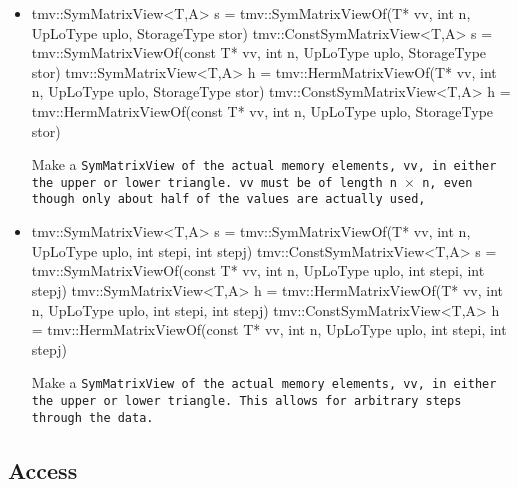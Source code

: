 \begin{itemize}
\item
\begin{tmvcode}
tmv::SymMatrixView<T,A> s = 
      tmv::SymMatrixViewOf(T* vv, int n, UpLoType uplo, 
      StorageType stor)
tmv::ConstSymMatrixView<T,A> s =
      tmv::SymMatrixViewOf(const T* vv, int n, UpLoType uplo, 
      StorageType stor)
tmv::SymMatrixView<T,A> h =
      tmv::HermMatrixViewOf(T* vv, int n, UpLoType uplo, 
      StorageType stor)
tmv::ConstSymMatrixView<T,A> h =
      tmv::HermMatrixViewOf(const T* vv, int n, UpLoType uplo, 
      StorageType stor)
\end{tmvcode}
Make a \tt{SymMatrixView} of the actual memory elements, \tt{vv}, in either the 
upper or lower triangle.
\tt{vv} must be of length \tt{n} $\times$ \tt{n}, even though only about half 
of the values are actually used,

\item
\begin{tmvcode}
tmv::SymMatrixView<T,A> s = 
      tmv::SymMatrixViewOf(T* vv, int n, UpLoType uplo, 
      int stepi, int stepj)
tmv::ConstSymMatrixView<T,A> s =
      tmv::SymMatrixViewOf(const T* vv, int n, UpLoType uplo, 
      int stepi, int stepj)
tmv::SymMatrixView<T,A> h =
      tmv::HermMatrixViewOf(T* vv, int n, UpLoType uplo, 
      int stepi, int stepj)
tmv::ConstSymMatrixView<T,A> h =
      tmv::HermMatrixViewOf(const T* vv, int n, UpLoType uplo, 
      int stepi, int stepj)
\end{tmvcode}
Make a \tt{SymMatrixView} of the actual memory elements, \tt{vv}, in either the 
upper or lower triangle.  This allows for arbitrary steps through the data.

\end{itemize}

\subsection{Access}
\label{SymMatrix_Access}

